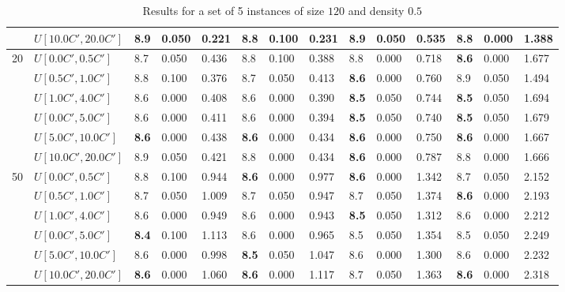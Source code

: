 \begin{table}[h]
{\begin{tabular}{|l|l||l|l|l||l|l|l||l|l|l||l|l|l|}
       & $U[10.0C',20.0C']$ & 8.9 & 0.050 & 0.221 & \textbf{8.8} & 0.100 & 0.231 & 8.9 & 0.050 & 0.535 & \textbf{8.8} & 0.000 & 1.388 \\
      \hline\hline
      \multirow{6}{*}{20} & $U[0.0C',0.5C']$ & 8.7 & 0.050 & 0.436 & 8.8 & 0.100 & 0.388 & 8.8 & 0.000 & 0.718 & \textbf{8.6} & 0.000 & 1.677 \\
       & $U[0.5C',1.0C']$ & 8.8 & 0.100 & 0.376 & 8.7 & 0.050 & 0.413 & \textbf{8.6} & 0.000 & 0.760 & 8.9 & 0.050 & 1.494 \\
       & $U[1.0C',4.0C']$ & 8.6 & 0.000 & 0.408 & 8.6 & 0.000 & 0.390 & \textbf{8.5} & 0.050 & 0.744 & \textbf{8.5} & 0.050 & 1.694 \\
       & $U[0.0C',5.0C']$ & 8.6 & 0.000 & 0.411 & 8.6 & 0.000 & 0.394 & \textbf{8.5} & 0.050 & 0.740 & \textbf{8.5} & 0.050 & 1.679 \\
       & $U[5.0C',10.0C']$ & \textbf{8.6} & 0.000 & 0.438 & \textbf{8.6} & 0.000 & 0.434 & \textbf{8.6} & 0.000 & 0.750 & \textbf{8.6} & 0.000 & 1.667 \\
       & $U[10.0C',20.0C']$ & 8.9 & 0.050 & 0.421 & 8.8 & 0.000 & 0.434 & \textbf{8.6} & 0.000 & 0.787 & 8.8 & 0.000 & 1.666 \\
      \hline\hline
      \multirow{6}{*}{50} & $U[0.0C',0.5C']$ & 8.8 & 0.100 & 0.944 & \textbf{8.6} & 0.000 & 0.977 & \textbf{8.6} & 0.000 & 1.342 & 8.7 & 0.050 & 2.152 \\
       & $U[0.5C',1.0C']$ & 8.7 & 0.050 & 1.009 & 8.7 & 0.050 & 0.947 & 8.7 & 0.050 & 1.374 & \textbf{8.6} & 0.000 & 2.193 \\
       & $U[1.0C',4.0C']$ & 8.6 & 0.000 & 0.949 & 8.6 & 0.000 & 0.943 & \textbf{8.5} & 0.050 & 1.312 & 8.6 & 0.000 & 2.212 \\
       & $U[0.0C',5.0C']$ & \textbf{8.4} & 0.100 & 1.113 & 8.6 & 0.000 & 0.965 & 8.5 & 0.050 & 1.354 & 8.5 & 0.050 & 2.249 \\
       & $U[5.0C',10.0C']$ & 8.6 & 0.000 & 0.998 & \textbf{8.5} & 0.050 & 1.047 & 8.6 & 0.000 & 1.300 & 8.6 & 0.000 & 2.232 \\
       & $U[10.0C',20.0C']$ & \textbf{8.6} & 0.000 & 1.060 & \textbf{8.6} & 0.000 & 1.117 & 8.7 & 0.050 & 1.363 & \textbf{8.6} & 0.000 & 2.318 \\
      \hline
      \end{tabular}
      }
      \caption{Results for a set of 5 instances of size $120$ and density $0.5$}
      \label{tab:pcpn120}\end{table}
	
